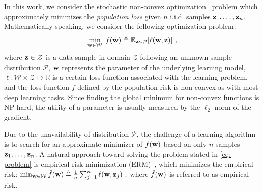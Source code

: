 \documentclass[11pt]{article}
\begin{document}
In this work, we consider the stochastic non-convex optimization~\cite{Proc:Zaheer_NeurIPS18} problem which approximately minimizes the \emph{population loss} given $n $ i.i.d. samples $\mathbf{z}_{1}, \dots, \mathbf{z}_{n}$. Mathematically speaking, we consider the following optimization problem:
\begin{equation} \label{eq: problem}
 \min_{\w \in \cW}~ f({\w})
 \triangleq {\mathbb{E}_{\z \sim \mathcal{P}}}[\ell(\w,\z)]~,
\end{equation}
where $\mathbf{z}\in \mathcal{Z}$ is a data sample in domain $\mathcal{Z}$ following an unknown sample distribution $\mathcal{P}$, ${\mathbf{w}}$ represents the parameter of the underlying learning model, $\ell:\mathcal{W}\times \mathcal{Z}\mapsto \mathbb{R} $ is a certain loss function associated with the learning problem, and the loss function $f$ defined by the population risk is non-convex as with most deep learning tasks. Since  finding the global minimum for non-convex functions
is NP-hard, the utility of a  parameter is usually measured by the $\ell_2$-norm of the gradient. 

Due to the unavailability of distribution $\mathcal{P}$,  the
challenge of a learning algorithm is to search for an approximate minimizer of $f(\mathbf{w})$ based on only 
$n$ samples $\mathbf{z}_{1}, \dots, \mathbf{z}_{n}$.
A natural approach toward solving the problem stated in \eqref{eq: problem} is empirical risk minimization (ERM)~\citep{shbe14}, which minimizes the empirical risk:  $\min_{\w \in \cW}  
   \hat f(\w)  \triangleq \frac{1}{n}\sum_{j =1}^{n} \ell(\w, \z_j)~,$
where $\hat f(\mathbf{w})$ is referred to as empirical risk. 

\end{document}
